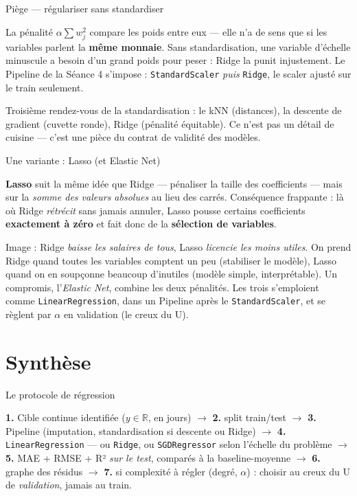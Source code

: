 \documentclass[aspectratio=169,11pt]{beamer}
\begin{document}
\begin{frame}{Piège — régulariser sans standardiser}
\begin{ucadpiege}
{\small La pénalité $\alpha\sum w_j^2$ compare les poids entre eux — elle n'a de sens que si les variables parlent la \textbf{même monnaie}. Sans standardisation, une variable d'échelle minuscule a besoin d'un grand poids pour peser : Ridge la punit injustement. Le Pipeline de la Séance 4 s'impose : \texttt{StandardScaler} \emph{puis} \texttt{Ridge}, le scaler ajusté sur le train seulement.}
\end{ucadpiege}
{\small Troisième rendez-vous de la standardisation : le kNN (distances), la descente de gradient (cuvette ronde), Ridge (pénalité équitable). Ce n'est pas un détail de cuisine — c'est une pièce du contrat de validité des modèles.}
\end{frame}

\begin{frame}{Une variante : Lasso (et Elastic Net)}
\begin{ucaddef}
{\small \textbf{Lasso} suit la même idée que Ridge — pénaliser la taille des coefficients — mais sur la \emph{somme des valeurs absolues} au lieu des carrés. Conséquence frappante : là où Ridge \emph{rétrécit} sans jamais annuler, Lasso pousse certains coefficients \textbf{exactement à zéro} et fait donc de la \textbf{sélection de variables}.}
\end{ucaddef}
{\small Image : Ridge \emph{baisse les salaires de tous}, Lasso \emph{licencie les moins utiles}. On prend Ridge quand toutes les variables comptent un peu (stabiliser le modèle), Lasso quand on en soupçonne beaucoup d'inutiles (modèle simple, interprétable). Un compromis, l'\emph{Elastic Net}, combine les deux pénalités. Les trois s'emploient comme \texttt{LinearRegression}, dans un Pipeline après le \texttt{StandardScaler}, et se règlent par $\alpha$ en validation (le creux du U).}
\end{frame}

\section{Synthèse}

\begin{frame}{Le protocole de régression}
\begin{ucadret}
{\small \textbf{1.} Cible continue identifiée ($y \in \mathbb{R}$, en jours) $\to$ \textbf{2.} split train/test $\to$ \textbf{3.} Pipeline (imputation, standardisation si descente ou Ridge) $\to$ \textbf{4.} \texttt{LinearRegression} — ou \texttt{Ridge}, ou \texttt{SGDRegressor} selon l'échelle du problème $\to$ \textbf{5.} MAE + RMSE + R² \emph{sur le test}, comparés à la baseline-moyenne $\to$ \textbf{6.} graphe des résidus $\to$ \textbf{7.} si complexité à régler (degré, $\alpha$) : choisir au creux du U de \emph{validation}, jamais au train.}
\end{ucadret}
\end{frame}
\end{document}
